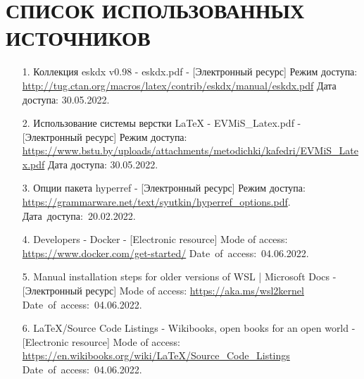 \documentclass[
    12pt, %
    a4paper, %
    simple, %
    floatsection %
]{eskdtext}
\begin{document}
\newpage
{}
\section*{СПИСОК ИСПОЛЬЗОВАННЫХ ИСТОЧНИКОВ}
\begin{enumerate}
    \item[1.] Коллекция eskdx v0.98 - eskdx.pdf
    - [Электронный ресурс]
    Режим доступа: \url{http://tug.ctan.org/macros/latex/contrib/eskdx/manual/eskdx.pdf}
    Дата доступа: 30.05.2022.

    \item[2.] Использование системы верстки LaTeX - EVMiS\_Latex.pdf
    - [Электронный ресурс]
    Режим доступа: \url{https://www.bstu.by/uploads/attachments/metodichki/kafedri/EVMiS_Latex.pdf}
    Дата доступа: 30.05.2022.

    \item[3.] Опции пакета hyperref
    - [Электронный ресурс]
    Режим доступа: \url{https://grammarware.net/text/syutkin/hyperref_options.pdf}.
    Дата~доступа:~20.02.2022.

    \item[4.] Developers - Docker
    - [Electronic resource]
    Mode of access: \url{https://www.docker.com/get-started/}
    Date~of~access:~04.06.2022.

    \item[5.] Manual installation steps for older versions of WSL | Microsoft Docs
    - [Электронный ресурс]
    Mode of access: \url{https://aka.ms/wsl2kernel}
    Date~of~access:~04.06.2022.

    \item[6.] LaTeX/Source Code Listings - Wikibooks, open books for an open world
    - [Electronic resource]
    Mode of access: \url{https://en.wikibooks.org/wiki/LaTeX/Source_Code_Listings}
    Date~of~access:~04.06.2022.
\end{enumerate}


\newpage
\end{document}
